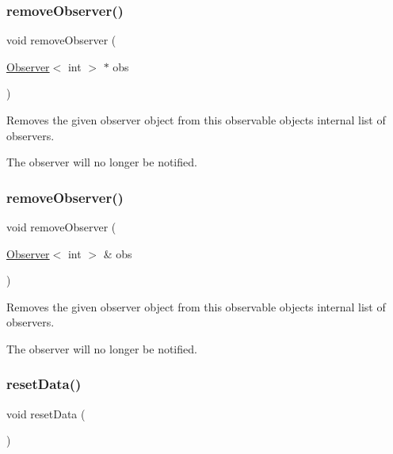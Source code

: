 \subsubsection{\texorpdfstring{remove\+Observer()}{removeObserver()}\hspace{0.1cm}{\footnotesize\ttfamily [1/2]}}
{\footnotesize\ttfamily void remove\+Observer (\begin{DoxyParamCaption}\item[{\mbox{\hyperlink{classObserver}{Observer}}$<$ int  $>$ $\ast$}]{obs }\end{DoxyParamCaption})\hspace{0.3cm}{\ttfamily [inherited]}}



Removes the given observer object from this observable object\textquotesingle{}s internal list of observers. 

The observer will no longer be notified. \mbox{\label{classObservable_a36b9c4607c1cab08dc800daa5aa38b82}} 
\subsubsection{\texorpdfstring{remove\+Observer()}{removeObserver()}\hspace{0.1cm}{\footnotesize\ttfamily [2/2]}}
{\footnotesize\ttfamily void remove\+Observer (\begin{DoxyParamCaption}\item[{\mbox{\hyperlink{classObserver}{Observer}}$<$ int  $>$ \&}]{obs }\end{DoxyParamCaption})\hspace{0.3cm}{\ttfamily [inherited]}}



Removes the given observer object from this observable object\textquotesingle{}s internal list of observers. 

The observer will no longer be notified. \mbox{\label{classVertexGen_ab51301d11ddc80165b3b7798b866421e}} 
\subsubsection{\texorpdfstring{reset\+Data()}{resetData()}}
{\footnotesize\ttfamily void reset\+Data (\begin{DoxyParamCaption}{ }\end{DoxyParamCaption})}



